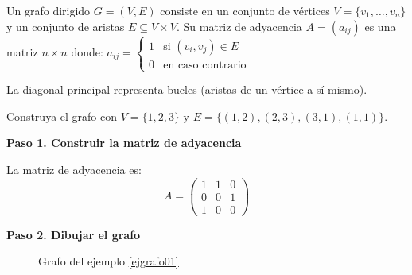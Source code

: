 \begin{definition}
Un grafo dirigido $G = (V,E)$ consiste en un conjunto de vértices $V = \{v_1, \dots, v_n\}$ y un conjunto de aristas $E \subseteq V \times V$. Su matriz de adyacencia $A = (a_{ij})$ es una matriz $n \times n$ donde:
\(
a_{ij} = 
\begin{cases} 
1 & \text{si } (v_i, v_j) \in E \\
0 & \text{en caso contrario}
\end{cases}
\)


La diagonal principal representa bucles (aristas de un vértice a sí mismo).
\end{definition}

\begin{example}\label{ejgrafo01}
Construya el grafo con $V = \{1, 2, 3\}$ y $E = \{(1,2), (2,3), (3,1), (1,1)\}$.
\begin{myproof}
\textbf{Paso 1. Construir la matriz de adyacencia}

La matriz de adyacencia es:
\[
\boxed{A = \begin{pmatrix}
1 & 1 & 0 \\
0 & 0 & 1 \\
1 & 0 & 0
\end{pmatrix}}
\]

\textbf{Paso 2. Dibujar el grafo}

\begin{figure}[H]
\centering
{}
\caption{Grafo del ejemplo \ref{ejgrafo01}}
\label{fig:grafo_ejemplo01}
\end{figure}
\end{myproof}
\end{example}

